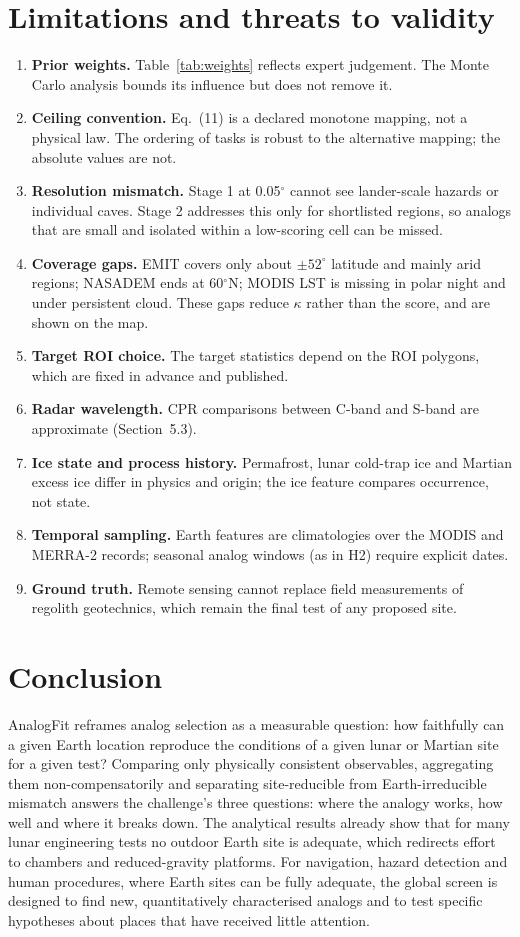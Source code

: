 \documentclass[11pt,a4paper]{article}
\begin{document}
\section{Limitations and threats to validity}
\begin{enumerate}
\item \textbf{Prior weights.} Table~\ref{tab:weights} reflects expert judgement. The Monte Carlo analysis bounds its influence but does not remove it.
\item \textbf{Ceiling convention.} Eq.~(11) is a declared monotone mapping, not a physical law. The ordering of tasks is robust to the alternative mapping; the absolute values are not.
\item \textbf{Resolution mismatch.} Stage 1 at 0.05$^\circ$ cannot see lander-scale hazards or individual caves. Stage 2 addresses this only for shortlisted regions, so analogs that are small and isolated within a low-scoring cell can be missed.
\item \textbf{Coverage gaps.} EMIT covers only about $\pm52^\circ$ latitude and mainly arid regions; NASADEM ends at 60$^\circ$N; MODIS LST is missing in polar night and under persistent cloud. These gaps reduce $\kappa$ rather than the score, and are shown on the map.
\item \textbf{Target ROI choice.} The target statistics depend on the ROI polygons, which are fixed in advance and published.
\item \textbf{Radar wavelength.} CPR comparisons between C-band and S-band are approximate (Section~5.3).
\item \textbf{Ice state and process history.} Permafrost, lunar cold-trap ice and Martian excess ice differ in physics and origin; the ice feature compares occurrence, not state.
\item \textbf{Temporal sampling.} Earth features are climatologies over the MODIS and MERRA-2 records; seasonal analog windows (as in H2) require explicit dates.
\item \textbf{Ground truth.} Remote sensing cannot replace field measurements of regolith geotechnics, which remain the final test of any proposed site.
\end{enumerate}

\section{Conclusion}
AnalogFit reframes analog selection as a measurable question: how faithfully can a given Earth location reproduce the conditions of a given lunar or Martian site for a given test? Comparing only physically consistent observables, aggregating them non-compensatorily and separating site-reducible from Earth-irreducible mismatch answers the challenge's three questions: where the analogy works, how well and where it breaks down. The analytical results already show that for many lunar engineering tests no outdoor Earth site is adequate, which redirects effort to chambers and reduced-gravity platforms. For navigation, hazard detection and human procedures, where Earth sites can be fully adequate, the global screen is designed to find new, quantitatively characterised analogs and to test specific hypotheses about places that have received little attention.
\end{document}
